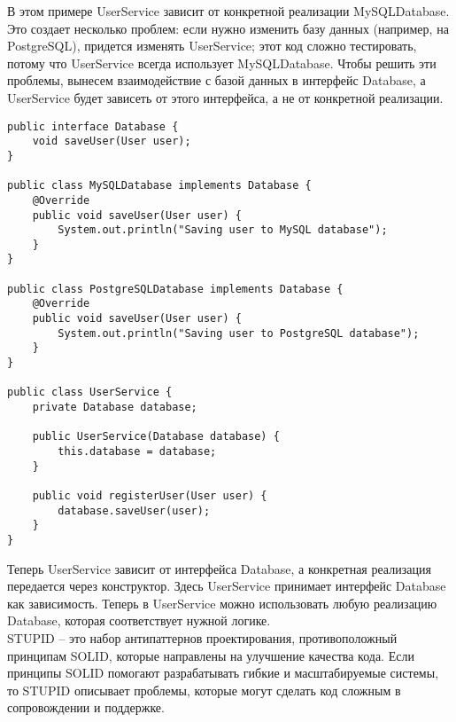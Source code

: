 В этом примере UserService зависит от конкретной реализации MySQLDatabase. Это создает несколько проблем: если нужно изменить базу данных (например, на PostgreSQL), придется изменять UserService; этот код сложно тестировать, потому что UserService всегда использует MySQLDatabase. Чтобы решить эти проблемы, вынесем взаимодействие с базой данных в интерфейс Database, а UserService будет зависеть от этого интерфейса, а не от конкретной реализации. \\
\begin{lstlisting}
public interface Database {
    void saveUser(User user);
}

public class MySQLDatabase implements Database {
    @Override
    public void saveUser(User user) {
        System.out.println("Saving user to MySQL database");
    }
}

public class PostgreSQLDatabase implements Database {
    @Override
    public void saveUser(User user) {
        System.out.println("Saving user to PostgreSQL database");
    }
}

public class UserService {
    private Database database;

    public UserService(Database database) {
        this.database = database;
    }

    public void registerUser(User user) {
        database.saveUser(user);
    }
}
\end{lstlisting}
Теперь UserService зависит от интерфейса Database, а конкретная реализация передается через конструктор. Здесь UserService принимает интерфейс Database как зависимость. Теперь в UserService можно использовать любую реализацию Database, которая соответствует нужной логике. \\
\noindent STUPID – это набор антипаттернов проектирования, противоположный принципам SOLID, которые направлены на улучшение качества кода. Если принципы SOLID помогают разрабатывать гибкие и масштабируемые системы, то STUPID описывает проблемы, которые могут сделать код сложным в сопровождении и поддержке.
